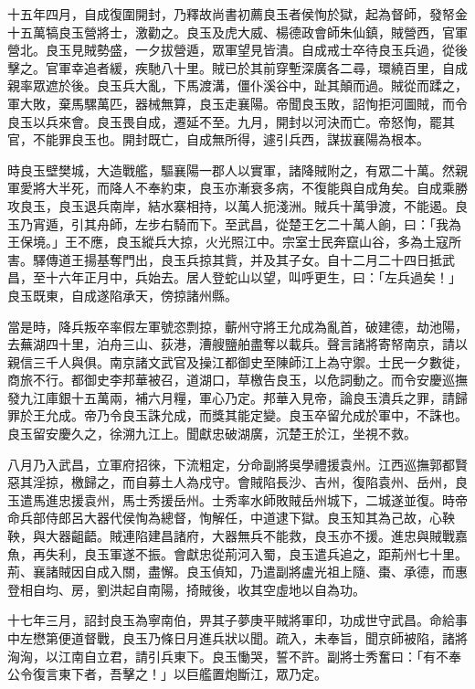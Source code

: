 \begin{pinyinscope}
十五年四月，自成復圍開封，乃釋故尚書初薦良玉者侯恂於獄，起為督師，發帑金十五萬犒良玉營將士，激勸之。良玉及虎大威、楊德政會師朱仙鎮，賊營西，官軍營北。良玉見賊勢盛，一夕拔營遁，眾軍望見皆潰。自成戒士卒待良玉兵過，從後擊之。官軍幸追者緩，疾馳八十里。賊已於其前穿塹深廣各二尋，環繞百里，自成親率眾遮於後。良玉兵大亂，下馬渡溝，僵仆溪谷中，趾其顛而過。賊從而蹂之，軍大敗，棄馬騾萬匹，器械無算，良玉走襄陽。帝聞良玉敗，詔恂拒河圖賊，而令良玉以兵來會。良玉畏自成，遷延不至。九月，開封以河決而亡。帝怒恂，罷其官，不能罪良玉也。開封既亡，自成無所得，遽引兵西，謀拔襄陽為根本。

時良玉壁樊城，大造戰艦，驅襄陽一郡人以實軍，諸降賊附之，有眾二十萬。然親軍愛將大半死，而降人不奉約束，良玉亦漸衰多病，不復能與自成角矣。自成乘勝攻良玉，良玉退兵南岸，結水寨相持，以萬人扼淺洲。賊兵十萬爭渡，不能遏。良玉乃宵遁，引其舟師，左步右騎而下。至武昌，從楚王乞二十萬人餉，曰：「我為王保境。」王不應，良玉縱兵大掠，火光照江中。宗室士民奔竄山谷，多為土寇所害。驛傳道王揚基奪門出，良玉兵掠其貲，并及其子女。自十二月二十四日抵武昌，至十六年正月中，兵始去。居人登蛇山以望，叫呼更生，曰：「左兵過矣！」良玉既東，自成遂陷承天，傍掠諸州縣。

當是時，降兵叛卒率假左軍號恣剽掠，蘄州守將王允成為亂首，破建德，劫池陽，去蕪湖四十里，泊舟三山、荻港，漕艘鹽舶盡奪以載兵。聲言諸將寄帑南京，請以親信三千人與俱。南京諸文武官及操江都御史至陳師江上為守禦。士民一夕數徙，商旅不行。都御史李邦華被召，道湖口，草檄告良玉，以危詞動之。而令安慶巡撫發九江庫銀十五萬兩，補六月糧，軍心乃定。邦華入見帝，論良玉潰兵之罪，請歸罪於王允成。帝乃令良玉誅允成，而獎其能定變。良玉卒留允成於軍中，不誅也。良玉留安慶久之，徐溯九江上。聞獻忠破湖廣，沉楚王於江，坐視不救。

八月乃入武昌，立軍府招徠，下流粗定，分命副將吳學禮援袁州。江西巡撫郭都賢惡其淫掠，檄歸之，而自募土人為戍守。會賊陷長沙、吉州，復陷袁州、岳州，良玉遣馬進忠援袁州，馬士秀援岳州。士秀率水師敗賊岳州城下，二城遂並復。時帝命兵部侍郎呂大器代侯恂為總督，恂解任，中道逮下獄。良玉知其為己故，心鞅鞅，與大器齟齬。賊連陷建昌諸府，大器無兵不能救，良玉亦不援。進忠與賊戰嘉魚，再失利，良玉軍遂不振。會獻忠從荊河入蜀，良玉遣兵追之，距荊州七十里。荊、襄諸賊因自成入關，盡懈。良玉偵知，乃遣副將盧光祖上隨、棗、承德，而惠登相自均、房，劉洪起自南陽，掎賊後，收其空虛地以自為功。

十七年三月，詔封良玉為寧南伯，畀其子夢庚平賊將軍印，功成世守武昌。命給事中左懋第便道督戰，良玉乃條日月進兵狀以聞。疏入，未奉旨，聞京師被陷，諸將洶洶，以江南自立君，請引兵東下。良玉慟哭，誓不許。副將士秀奮曰：「有不奉公令復言東下者，吾擊之！」以巨艦置炮斷江，眾乃定。


\end{pinyinscope}
